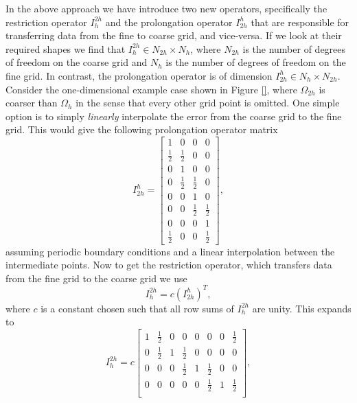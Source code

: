 In the above approach we have introduce two new operators, specifically the restriction operator $I_{h}^{2h}$ and the prolongation operator $I_{2h}^{h}$ that are responsible for transferring data from the fine to coarse grid, and vice-versa. If we look at their required shapes we find that $I_{h}^{2h} \in N_{2h} \times N_h$, where $N_{2h}$ is the number of degrees of freedom on the coarse grid and $N_h$ is the number of degrees of freedom on the fine grid. In contrast, the prolongation operator is of dimension $I_{2h}^{h} \in N_{h} \times N_{2h}$. Consider the one-dimensional example case shown in Figure \ref{}, where $\Omega_{2h}$ is coarser than $\Omega_h$ in the sense that every other grid point is omitted. One simple option is to simply {\it linearly} interpolate the error from the coarse grid to the fine grid. This would give the following prolongation operator matrix
\begin{equation}
	I_{2h}^{h} = 
	\begin{bmatrix}
	    1 & 0 & 0 & 0 \\
			\frac{1}{2} & \frac{1}{2} & 0 & 0 \\
			0 & 1 & 0 & 0 \\
			0 & \frac{1}{2} & \frac{1}{2} & 0 \\
	    0 & 0 & 1 & 0 \\
			0 & 0 & \frac{1}{2} & \frac{1}{2} \\
			0 & 0 & 0 & 1 \\
			\frac{1}{2} & 0 & 0 & \frac{1}{2}
	\end{bmatrix},
\end{equation}
assuming periodic boundary conditions and a linear interpolation between the intermediate points. Now to get the restriction operator, which transfers data from the fine grid to the coarse grid we use
\begin{equation}
	I_{h}^{2h} = c (I_{2h}^{h})^T,
\end{equation}
where $c$ is a constant chosen such that all row sums of $I_{h}^{2h}$ are unity. This expands to
\begin{equation}
	I_{h}^{2h} = c
	\begin{bmatrix}
	    1 & \frac{1}{2} & 0 & 0 & 0 & 0 & 0 & \frac{1}{2} \\
			0 & \frac{1}{2} & 1 & \frac{1}{2} & 0 & 0 & 0 & 0 \\
			0 & 0 & 0 & \frac{1}{2} & 1 & \frac{1}{2} & 0 & 0 \\
			0 & 0 & 0 & 0 & 0 & \frac{1}{2} & 1 & \frac{1}{2} \\
	\end{bmatrix},
\end{equation}
